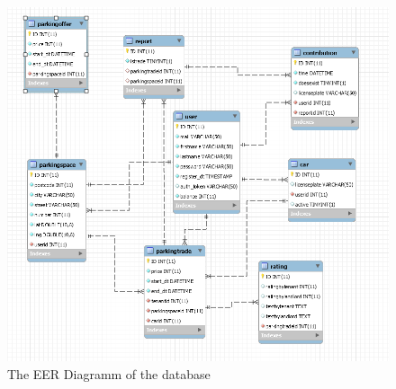 \begin{figure}
	\centering
	\includegraphics[width=14cm]{logos/eer-diagramm.png}
	\caption{The EER Diagramm of the database}
	\label{img:eer-diagramm}
\end{figure}

